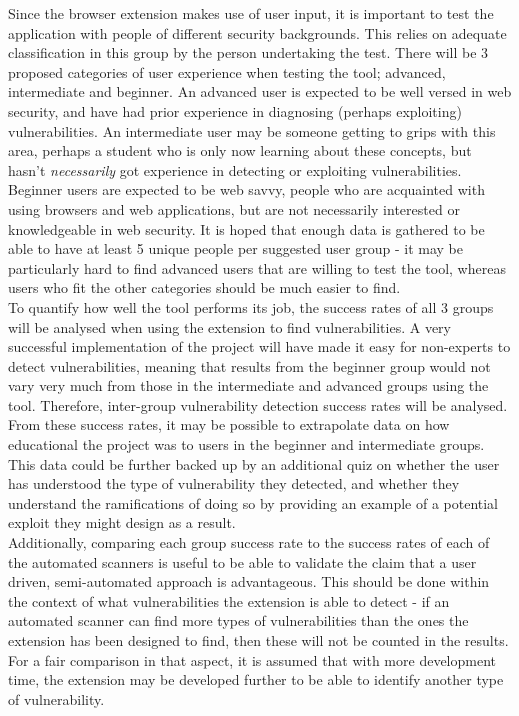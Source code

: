 Since the browser extension makes use of user input, it is important to test the application with people of different security backgrounds. This relies on adequate classification in this group by the person undertaking the test. There will be 3 proposed categories of user experience when testing the tool; advanced, intermediate and beginner. An advanced user is expected to be well versed in web security, and have had prior experience in diagnosing (perhaps exploiting) vulnerabilities. An intermediate user may be someone getting to grips with this area, perhaps a student who is only now learning about these concepts, but hasn't \emph{necessarily} got experience in detecting or exploiting vulnerabilities. Beginner users are expected to be web savvy, people who are acquainted with using browsers and web applications, but are not necessarily interested or knowledgeable in web security. It is hoped that enough data is gathered to be able to have at least 5 unique people per suggested user group - it may be particularly hard to find advanced users that are willing to test the tool, whereas users who fit the other categories should be much easier to find. \\

To quantify how well the tool performs its job, the success rates of all 3 groups will be analysed when using the extension to find vulnerabilities. A very successful implementation of the project will have made it easy for non-experts to detect vulnerabilities, meaning that results from the beginner group would not vary very much from those in the intermediate and advanced groups using the tool. Therefore, inter-group vulnerability detection success rates will be analysed. From these success rates, it may be possible to extrapolate data on how educational the project was to users in the beginner and intermediate groups. This data could be further backed up by an additional quiz on whether the user has understood the type of vulnerability they detected, and whether they understand the ramifications of doing so by providing an example of a potential exploit they might design as a result. \\

Additionally, comparing each group success rate to the success rates of each of the automated scanners is useful to be able to validate the claim that a user driven, semi-automated approach is advantageous. This should be done within the context of what vulnerabilities the extension is able to detect - if an automated scanner can find more types of vulnerabilities than the ones the extension has been designed to find, then these will not be counted in the results. For a fair comparison in that aspect, it is assumed that with more development time, the extension may be developed further to be able to identify another type of vulnerability. \\

